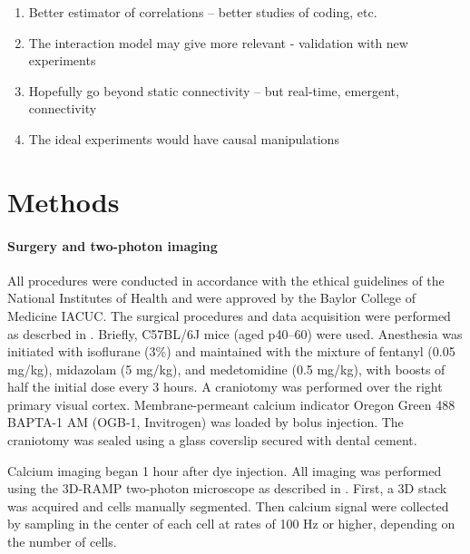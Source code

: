 \documentclass[10pt]{article}
\begin{document}
\begin{enumerate}
    \item Better estimator of correlations -- better studies of coding, etc.
    \item The interaction model may give more relevant - validation with new experiments 
    \item Hopefully go beyond static connectivity -- but real-time, emergent, connectivity 
    \item The ideal  experiments  would have causal manipulations 
\end{enumerate}

\section*{Methods}
\paragraph{Surgery and two-photon imaging}
All procedures were conducted in accordance with the ethical guidelines of the National Institutes of Health and were approved by the Baylor College of Medicine IACUC.  The surgical procedures and data acquisition were performed as descrbed in \cite{Cotton:2013}. Briefly, C57BL/6J mice (aged p40--60) were used. Anesthesia was initiated with isoflurane (3\%) and maintained with the mixture of fentanyl (0.05 mg/kg), midazolam (5 mg/kg), and medetomidine (0.5 mg/kg), with boosts of half the initial dose every 3 hours.  A craniotomy was performed over the right primary visual cortex.  Membrane-permeant calcium indicator Oregon Green 488 BAPTA-1 AM (OGB-1, Invitrogen) was loaded by bolus injection.  The craniotomy was sealed using a glass coverslip secured with dental cement. 

Calcium imaging began 1 hour after dye injection.  All imaging was performed using the 3D-RAMP two-photon microscope as described in \cite{Cotton:2013}. First, a 3D stack was acquired and cells manually segmented. Then calcium signal were collected by sampling in the center of each cell at rates of 100 Hz or higher, depending on the number of cells.
\end{document}
